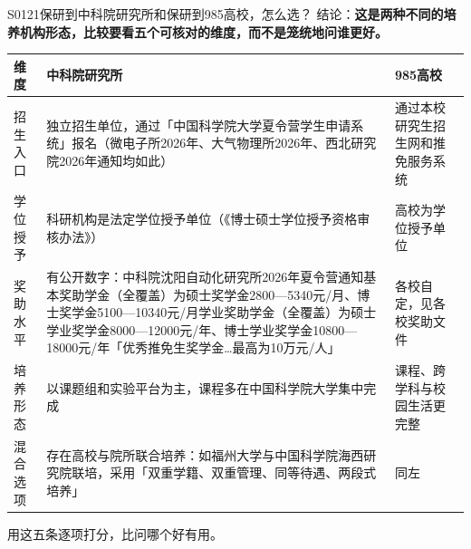 \begin{qa}{S0121}{保研到中科院研究所和保研到985高校，怎么选？}
结论：\textbf{这是两种不同的培养机构形态，比较要看五个可核对的维度，而不是笼统地问谁更好。}

\par\vspace{2pt}\nobreak\begin{center}\footnotesize
\begin{tabularx}{\textwidth}{>{\raggedright\arraybackslash}X>{\raggedright\arraybackslash}X>{\raggedright\arraybackslash}X}
\toprule
\textbf{维度} & \textbf{中科院研究所} & \textbf{985高校} \\ \midrule
招生入口 & 独立招生单位，通过「中国科学院大学夏令营学生申请系统」报名（微电子所2026年、大气物理所2026年、西北研究院2026年通知均如此） & 通过本校研究生招生网和推免服务系统 \\
学位授予 & 科研机构是法定学位授予单位（《博士硕士学位授予资格审核办法》） & 高校为学位授予单位 \\
奖助水平 & 有公开数字：中科院沈阳自动化研究所2026年夏令营通知基本奖助学金（全覆盖）为硕士奖学金2800—5340元/月、博士奖学金5100—10340元/月学业奖助学金（全覆盖）为硕士学业奖学金8000—12000元/年、博士学业奖学金10800—18000元/年「优秀推免生奖学金…最高为10万元/人」 & 各校自定，见各校奖助文件 \\
培养形态 & 以课题组和实验平台为主，课程多在中国科学院大学集中完成 & 课程、跨学科与校园生活更完整 \\
混合选项 & 存在高校与院所联合培养：如福州大学与中国科学院海西研究院联培，采用「双重学籍、双重管理、同等待遇、两段式培养」 & 同左 \\
\bottomrule
\end{tabularx}
\end{center}\vspace{2pt}\par

用这五条逐项打分，比问哪个好有用。
\end{qa}

